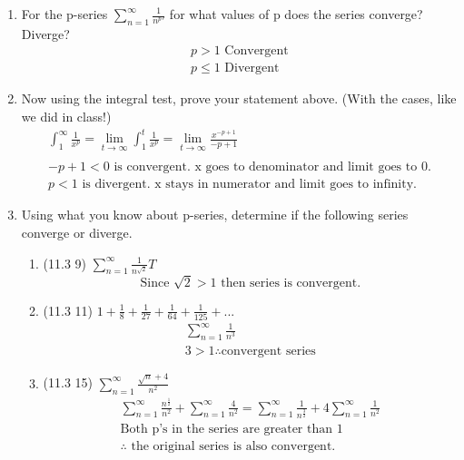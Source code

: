 \documentclass[12pt]{article}
\begin{document}
\begin{enumerate}
    \addtocounter{enumi}{15}\item For the p-series $\sum^\infty_{n=1}\frac{1}{n^p'}$ for what values of p does the series converge? Diverge?
    \begin{gather*}
        p > 1 \text{ Convergent}\\
        p \leq 1 \text{   Divergent}
    \end{gather*}
    \item Now using the integral test, prove your statement above. (With the cases, like we did in class!)
    \begin{gather*}
        \int_1^\infty\frac{1}{x^p}=\lim_{t\to\infty}\int^t_1\frac{1}{x^p}=\lim_{t\to\infty}\frac{x^{-p+1}}{-p+1}\\\\
        -p+1 < 0 \text{  is convergent. x goes to denominator and limit goes to 0.}\\ p < 1 \text{  is divergent. x stays in numerator and limit goes to infinity.}
    \end{gather*}
    \item Using what you know about p-series, determine if the following series converge or diverge.
    \begin{enumerate}
        \item (11.3 9) $\sum^\infty_{n=1}\frac{1}{n^\sqrt{2}}T$
        \begin{equation*}
            \text{Since } \sqrt{2} > 1 \text{  then series is convergent.} 
        \end{equation*}
        \item (11.3 11) $1+\frac{1}{8}+\frac{1}{27}+\frac{1}{64}+\frac{1}{125}+...$
        \begin{gather*}
            \sum_{n=1}^\infty\frac{1}{n^3}
            \\3 > 1 \therefore \text{convergent series}
        \end{gather*}
        \item (11.3 15) $\sum_{n=1}^\infty\frac{\sqrt{n}+4}{n^2}$
        \begin{gather*}
            \sum_{n=1}^\infty\frac{n^\frac{1}{2}}{n^2}+\sum_{n=1}^\infty\frac{4}{n^2}=\sum_{n=1}^\infty\frac{1}{n^\frac{3}{2}}+4\sum_{n=1}^\infty\frac{1}{n^2}\\
            \text{Both p's in the series are greater than 1}\\
            \text{$\therefore$ the original series is also convergent.}
        \end{gather*}

\end{enumerate}
\end{enumerate}
\end{document}
